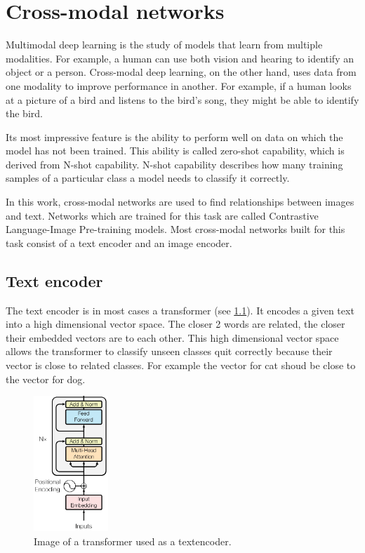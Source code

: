 %
%
%


\chapter{Cross-modal networks
    \label{chapter:crossmodalnetworks}}
    Multimodal deep learning is the study of models that learn from multiple modalities.
    For example, a human can use both vision and hearing to identify an object or a person.
    Cross-modal deep learning, on the other hand, uses data from one modality to improve performance in another.
    For example, if a human looks at a picture of a bird and listens to the bird's song, they might be able to identify the bird.

    Its most impressive feature is the ability to perform well on data on which the model has not been trained.
    This ability is called zero-shot capability, which is derived from N-shot capability.
    N-shot capability describes how many training samples of a particular class a model needs to classify it correctly.

    In this work, cross-modal networks are used to find relationships between images and text.
    Networks which are trained for this task are called Contrastive Language-Image Pre-training models.
    Most cross-modal networks built for this task consist of a text encoder and an image encoder.

    \section{Text encoder}
    The text encoder is in most cases a transformer (see \cref{fig:crossmodalnetworks:textencoder}).
    It encodes a given text into a high dimensional vector space.
    The closer 2 words are related, the closer their embedded vectors are to each other.
    This high dimensional vector space allows the transformer to classify unseen classes quit correctly because their vector is close to related classes.
    For example the vector for cat shoud be close to the vector for dog.

    \begin{figure}
        \centering
        \includegraphics[width=0.25\textwidth]{Images/crossmodalnetworks/The-Transformer-encoder-structure.png}
        \caption{Image of a transformer used as a textencoder\cite{fig:encoder}.}
        \label{fig:crossmodalnetworks:textencoder}
    \end{figure}
    


